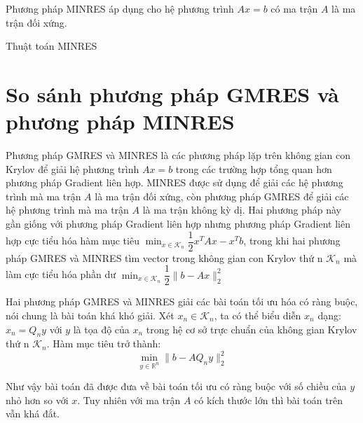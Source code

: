\documentclass[14pt, a4paper]{article}
\numberwithin{equation}{section}
\numberwithin{algorithm}{section}
\numberwithin{figure}{section}
\numberwithin{dl}{section}
\numberwithin{md}{section}
\numberwithin{bd}{section}
\begin{document}
Phương pháp MINRES áp dụng cho hệ phương trình $Ax=b$ có ma trận $A$ là ma trận đối xứng.

\begin{algorithm}
    \caption{Thuật toán MINRES}\label{alg:MINRES}
    \begin{algorithmic}
        \EndFor
    \end{algorithmic}
\end{algorithm}


\section{So sánh phương pháp GMRES và phương pháp MINRES}

Phương pháp GMRES và MINRES là các phương pháp lặp trên không gian con Krylov để giải hệ phương trình $Ax=b$ trong các trường hợp tổng quan hơn phương pháp Gradient liên hợp.
MINRES được sử dụng để giải các hệ phương trình mà ma trận $A$ là ma trận đối xứng, còn phương pháp GMRES để giải các hệ phương trình mà ma trận $A$ là ma trận không kỳ dị.
Hai phương pháp này gần giống với phương pháp Gradient liên hợp nhưng phương pháp Gradient liên hợp cực tiểu hóa hàm mục tiêu $\displaystyle \min_{x \in \mathcal{K}_n}\dfrac{1}{2}x^TAx - x^Tb$,
trong khi hai phương pháp GMRES và MINRES tìm vector trong không gian con Krylov thứ n $\displaystyle \mathcal{K}_n$ mà làm cực tiểu hóa phần dư $\displaystyle \min_{x \in \mathcal{K}_n}\dfrac{1}{2}\lVert b - Ax \rVert_2^2$

Hai phương pháp GMRES và MINRES giải các bài toán tối ưu hóa có ràng buộc, nói chung là bài toán khá khó giải. Xét $x_n \in \mathcal{K}_n$, ta có thể biểu diễn $x_n$ dạng:
$x_n = Q_n y$ với $y$ là tọa độ của $x_n$ trong hệ cơ sở trực chuẩn của không gian Krylov thứ n $\mathcal{K}_n$. Hàm mục tiêu trở thành:
\begin{equation} \min_{y \in \mathbb{R}^{n}}  \lVert b - AQ_n y \rVert_2^2\end{equation}

Như vậy bài toán đã được đưa về bài toán tối ưu có ràng buộc với số chiều của $y$ nhỏ hơn so với $x$. Tuy nhiên với ma trận $A$ có kích thước lớn thì bài toán trên vẫn khá đắt.
\end{document}
